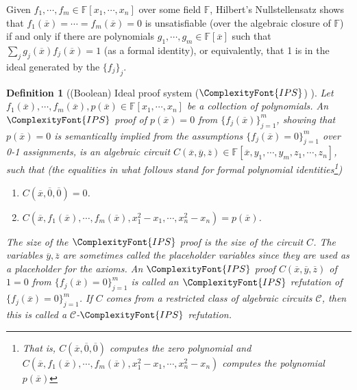\documentclass[11pt,letter]{article}
\newtheorem{definition}[theorem]{Definition}
\theoremstyle{remark} %
\newcommand{\IPS}{%
    {
        \ComplexityFont{IPS} 
    }
}
\begin{document}
{     Given $f_1,\cdots, f_m \in \mathbb{F}[x_1, \cdots,x_n]$ over some field $\mathbb{F}$, Hilbert's Nullstellensatz shows that $f_1(\overline{x})=\cdots = f_m(\overline{x})=0$ is unsatisfiable (over the algebraic closure of $\mathbb{F}$) if and only if there are polynomials $g_1,\cdots,g_m \in \mathbb{F}[\overline{x}]$ such that $\sum_j g_j(\overline{x}) f_j(\overline{x})=1$ (as a formal identity), or equivalently, that 1 is in the ideal generated by the $\{f_j\}_j$.
    \begin{definition}[(Boolean) Ideal proof system ($\IPS$) \cite{GP18}] \label{def: Boolean ips}
        Let $f_1(\overline{x}),\cdots,f_m(\overline{x}), p(\overline{x})\in \mathbb{F}[x_1,\cdots,x_n]$ be a collection of polynomials. An $\IPS$ proof of $p(\overline{x})=0$ from $\{f_j(\overline{x})\}_{j=1}^m$, showing that $p(\overline{x})=0$ is semantically implied from the assumptions $\{f_j(\overline{x})=0\}_{j=1}^m$ over 0-1 assignments, is an algebraic circuit $C(\overline{x},\overline{y},\overline{z}) \in \mathbb{F}[\overline{x}, y_1,\cdots,y_m,z_1,\cdots,z_n]$, such that (the equalities in what follows stand for formal polynomial identities\footnote{That is, $C(\overline{x},\overline{0},\overline{0})$ computes the zero polynomial and $C(\overline{x},f_1(\overline{x}),\cdots,f_m(\overline{x}),x_1^2-x_1, \cdots, x_n^2 -x_n)$ computes the polynomial $p(\overline{x})$})
        \begin{enumerate}
            \item $C(\overline{x},\overline{0},\overline{0})=0$.
            \item $C(\overline{x},f_1(\overline{x}), \cdots, f_m(\overline{x}),x_1^2-x_1 , \cdots, x_n^2 -x_n)=p(\overline{x})$.
        \end{enumerate}
        
        The size of the $\IPS$ proof is the size of the circuit $C$. The variables $\overline{y},\overline{z}$ are sometimes called the placeholder variables since they are used as a placeholder for the axioms. An $\IPS$ proof $C(\overline{x},\overline{y},\overline{z})$ of $1=0$ from $\{f_j(\overline{x})=0\}_{j=1}^m$ is called an $\IPS$ refutation of $\{f_j(\overline{x})=0\}_{j=1}^m$. 
        If $C$ comes from a restricted class of algebraic circuits $\mathcal{C}$, then this is called a $\mathcal{C}$-$\IPS$ refutation.
    \end{definition}

}
\end{document}
